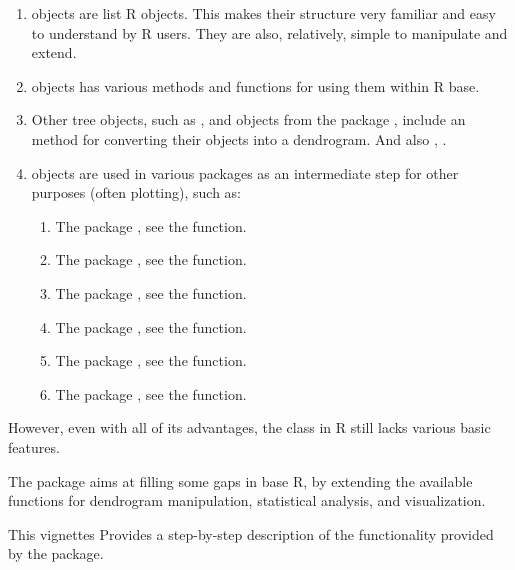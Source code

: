 \documentclass[shortnames,nojss,article]{jss}\usepackage[]{graphicx}\usepackage[]{color}
\begin{document}
\begin{enumerate}

   \item {} objects are list R objects. This makes their structure very familiar and easy to understand by R users. They are also, relatively, simple to manipulate and extend.
   \item {} objects has various methods and functions for using them within R base. 
   \item Other tree objects, such as , and objects from the  package \citep{CRAN:ape},  include an  method for converting their objects into a dendrogram. And also , .
   \item {} objects are used in various packages as an intermediate step for other purposes (often plotting), such as:
   
   \begin{enumerate}
   \item The  package \citep{CRAN:latticeExtra}, see the  function.
   \item The  package \citep{CRAN:labeltodendro}, see the  function.
   \item The  package \citep{CRAN:bclust}, see the  function.
   \item The  package \citep{CRAN:ggdendro}, see the  function.
   \item The  package \citep{CRAN:Heatplus}, see the  function.
   \item The  package \citep{CRAN:Heatplus}, see the  function.
   \end{enumerate}
   
\end{enumerate}
   


However, even with all of its advantages, the  class in R still lacks various basic features.

The  package aims at filling some gaps in base R, by extending the available functions for dendrogram manipulation, statistical analysis, and visualization.

This vignettes Provides a step-by-step description of the functionality provided by the  package.
\end{document}
